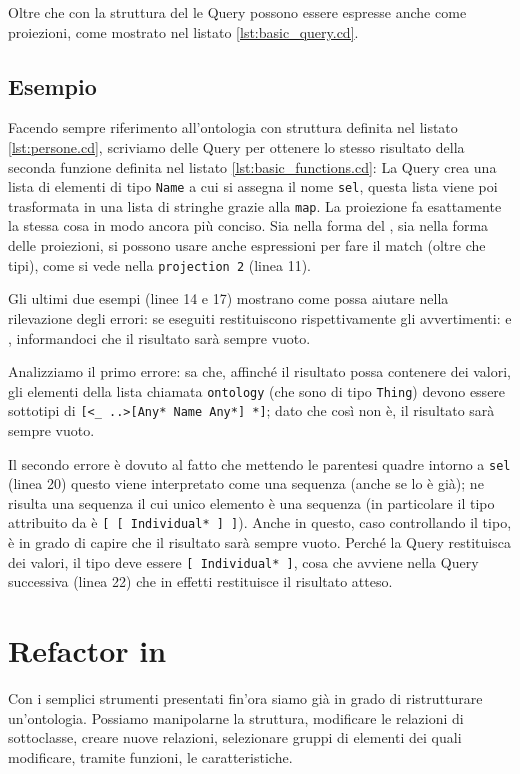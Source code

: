 Oltre che con la struttura del  le Query possono essere espresse anche come proiezioni, come mostrato nel listato \ref{lst:basic_query.cd}.

\subsection{Esempio}
Facendo sempre riferimento all'ontologia con struttura definita nel listato \ref{lst:persone.cd}, scriviamo delle Query per ottenere lo stesso risultato della seconda funzione definita nel listato \ref{lst:basic_functions.cd}:
La Query crea una lista di elementi di tipo \verb|Name| a cui si assegna il nome \verb|sel|, questa lista viene poi trasformata in una lista di stringhe grazie alla \verb|map|. La proiezione fa esattamente la stessa cosa in modo ancora più conciso. Sia nella forma del , sia nella forma delle proiezioni, si possono usare anche espressioni per fare il match (oltre che tipi), come si vede nella \verb|projection 2| (linea 11).

Gli ultimi due esempi (linee 14 e 17) mostrano come \cduce possa aiutare nella rilevazione degli errori: se eseguiti restituiscono rispettivamente gli avvertimenti:  e , informandoci che il risultato sarà sempre vuoto.

Analizziamo il primo errore: \cduce sa che, affinché il risultato possa contenere dei valori, gli elementi della lista chiamata \verb|ontology| (che sono di tipo \verb|Thing|) devono essere sottotipi di \verb|[<_ ..>[Any* Name Any*] *]|; dato che così non è, il risultato sarà sempre vuoto.

Il secondo errore è dovuto al fatto che mettendo le parentesi quadre intorno a \verb|sel| (linea 20) questo viene interpretato come una sequenza (anche se lo è già); ne risulta una sequenza il cui unico elemento è una sequenza (in particolare il tipo attribuito da \cduce è \verb|[ [ Individual* ] ]|). Anche in questo, caso controllando il tipo, \cduce è in grado di capire che il risultato sarà sempre vuoto. Perché la Query restituisca dei valori, il tipo deve essere \verb|[ Individual* ]|, cosa che avviene nella Query successiva (linea 22) che in effetti restituisce il risultato atteso.

\section{Refactor in \cduce}
Con i semplici strumenti presentati fin'ora siamo già in grado di ristrutturare un'ontologia. Possiamo manipolarne la struttura, modificare le relazioni di sottoclasse, creare nuove relazioni, selezionare gruppi di elementi dei quali modificare, tramite funzioni, le caratteristiche. 

